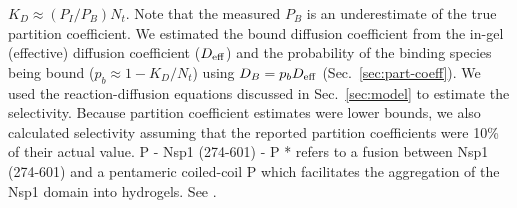 \begin{table}[h!]
{  $K_D \approx (P_I/P_B)N_t$. Note that the measured $P_B$ is an
  underestimate of the true partition coefficient. We estimated
  the bound diffusion
  coefficient  from the in-gel (effective)
  diffusion coefficient ($D_{\mathrm{eff}}$) and the probability of the
  binding species being bound ($p_b \approx 1-K_D/N_t$) using $D_B =
  p_bD_{\mathrm{eff}}$ (Sec.~\ref{sec:part-coeff}). We used the reaction-diffusion equations
  discussed in Sec.~\ref{sec:model} to estimate the selectivity.  Because
  partition coefficient estimates were lower bounds, we also
  calculated selectivity
  assuming that the reported
  partition coefficients were 10\% of their actual value. P -
  Nsp1 (274-601) - P * refers to a fusion between Nsp1 (274-601) and
  a pentameric coiled-coil P which facilitates the aggregation of
  the Nsp1 domain into hydrogels.  See \cite{kim15}.     \label{table:Gorlich}}                \end{table}